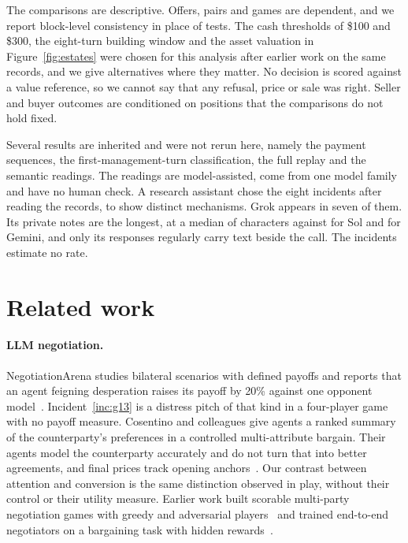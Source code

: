 The comparisons are descriptive. Offers, pairs and games are dependent, and we report block-level consistency in place of tests. The cash thresholds of \$100 and \$300, the eight-turn building window and the asset valuation in Figure~\ref{fig:estates} were chosen for this analysis after earlier work on the same records, and we give alternatives where they matter. No decision is scored against a value reference, so we cannot say that any refusal, price or sale was right. Seller and buyer outcomes are conditioned on positions that the comparisons do not hold fixed.

Several results are inherited and were not rerun here, namely the payment sequences, the first-management-turn classification, the full replay and the semantic readings. The readings are model-assisted, come from one model family and have no human check. A research assistant chose the eight incidents after reading the records, to show distinct mechanisms. Grok appears in seven of them. Its private notes are the longest, at a median of  characters against  for Sol and  for Gemini, and only its responses regularly carry text beside the call. The incidents estimate no rate.

\section{Related work}

\paragraph{LLM negotiation.} NegotiationArena studies bilateral scenarios with defined payoffs and reports that an agent feigning desperation raises its payoff by 20\% against one opponent model~\cite{bianchi2024negotiationarena}. Incident~\ref{inc:g13} is a distress pitch of that kind in a four-player game with no payoff measure. Cosentino and colleagues give agents a ranked summary of the counterparty's preferences in a controlled multi-attribute bargain. Their agents model the counterparty accurately and do not turn that into better agreements, and final prices track opening anchors~\cite{cosentino2026counterparty}. Our contrast between attention and conversion is the same distinction observed in play, without their control or their utility measure. Earlier work built scorable multi-party negotiation games with greedy and adversarial players~\cite{abdelnabi2024negotiation} and trained end-to-end negotiators on a bargaining task with hidden rewards~\cite{lewis2017deal}.

